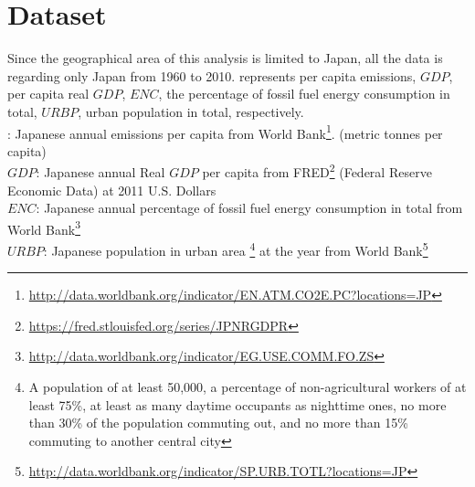 \documentclass[12pt, a4paper]{article}
\begin{document}
\section{Dataset}
Since the geographical area of this analysis is limited to Japan, all the data is regarding only Japan from 1960 to 2010.   represents per capita  emissions, $GDP$, per capita real $GDP$,  $ENC$, the percentage of fossil fuel energy consumption in total, $URBP$, urban population in total, respectively.\\
: Japanese annual    emissions  per  capita from  World  Bank\footnote{\url{http://data.worldbank.org/indicator/EN.ATM.CO2E.PC?locations=JP}}.  (metric tonnes per capita)\\
$GDP$: Japanese annual Real  $GDP$  per  capita from  FRED\footnote{\url{https://fred.stlouisfed.org/series/JPNRGDPR}} (Federal  Reserve  Economic  Data)  at 2011 U.S. Dollars\\
$ENC$: Japanese annual percentage of fossil fuel energy consumption in total from World Bank\footnote{\url{http://data.worldbank.org/indicator/EG.USE.COMM.FO.ZS}}\\
$URBP$: Japanese population in urban area \footnote{A population of at least 50,000, a  percentage of non-agricultural workers of at least 75\%, at least as many daytime occupants as nighttime ones, no more than 30\% of the population commuting out, and no more than 15\% commuting to another central city} at the year from World Bank\footnote{\url{http://data.worldbank.org/indicator/SP.URB.TOTL?locations=JP}}\\
\end{document}
